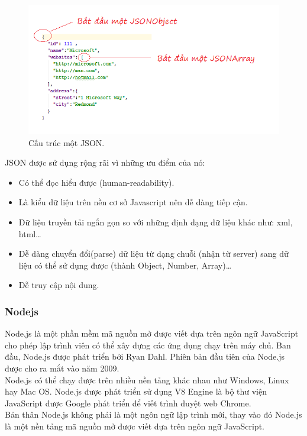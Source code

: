 \documentclass[a4paper,12pt,oneside]{article}
\begin{document}
\begin{center}
\begin{figure}[h]
\begin{center}
\includegraphics[scale=.8]{hinh/json.png}
\end{center}
\caption{Cấu trúc một JSON.}

\end{figure}
\end{center}

JSON được sử dụng rộng rãi vì những ưu điểm của nó:
\begin{itemize}
\item Có thể đọc hiểu được (human-readability).
\item Là kiểu dữ liệu trên nền cơ sở Javascript nên dễ dàng tiếp cận.
\item Dữ liệu truyền tải ngắn gọn so với những định dạng dữ liệu khác như: xml, html…
\item Dễ dàng chuyển đổi(parse) dữ liệu từ dạng chuỗi (nhận từ server) sang dữ liệu có thể sử dụng được (thành Object, Number, Array)…
\item Dễ truy cập nội dung.
\end{itemize}



\subsubsection{Nodejs}
\noindent Node.js là một phần mềm mã nguồn mở được viết dựa trên ngôn ngữ JavaScript cho phép lập trình viên có thể xây dựng các ứng dụng chạy trên máy chủ. Ban đầu, Node.js được phát triển bởi Ryan Dahl. Phiên bản đầu tiên của Node.js được cho ra mắt vào năm 2009.\\
 Node.js có thể chạy được trên nhiều nền tảng khác nhau như Windows, Linux hay Mac OS. Node.js được phát triển sử dụng V8 Engine là bộ thư viện JavaScript được Google phát triển để viết trình duyệt web Chrome.\\
 Bản thân Node.js không phải là một ngôn ngữ lập trình mới, thay vào đó Node.js là một nền tảng mã nguồn mở được viết dựa trên ngôn ngữ JavaScript.
\end{document}
